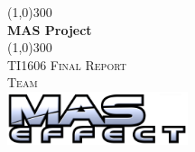 \begin{titlepage}
	\begin{center}
		\vspace*{2cm}
		\line(1,0){300} \\ [2mm]
		\huge{\bf MAS Project} \\ [-3mm]
		\line(1,0){300} \\ [1cm]
		\textsc{\LARGE TI1606 Final Report} \\ [2cm]
		\textsc{Team} \\
		\vspace{2mm}
		\includegraphics[width=200px]{./contents/graphics/MAS-Effect.pdf}\\
		\vspace{1cm}
		\normalsize
		

\end{center}
\end{titlepage}
